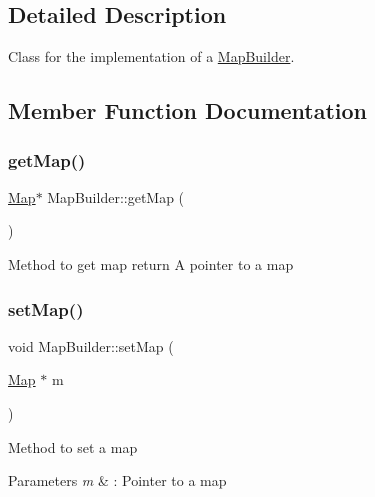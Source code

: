 \subsection{Detailed Description}
Class for the implementation of a \hyperlink{class_map_builder}{Map\+Builder}. 

\subsection{Member Function Documentation}
\hypertarget{class_map_builder_a6ea698affc46e8fab291eaf7b3ae8547}{}\label{class_map_builder_a6ea698affc46e8fab291eaf7b3ae8547} 
\subsubsection{\texorpdfstring{get\+Map()}{getMap()}}
{\footnotesize\ttfamily \hyperlink{class_map}{Map}$\ast$ Map\+Builder\+::get\+Map (\begin{DoxyParamCaption}{ }\end{DoxyParamCaption})\hspace{0.3cm}{\ttfamily [inline]}}

Method to get map return A pointer to a map \hypertarget{class_map_builder_aa8a9483778deb9083c5704b557adefdd}{}\label{class_map_builder_aa8a9483778deb9083c5704b557adefdd} 
\subsubsection{\texorpdfstring{set\+Map()}{setMap()}}
{\footnotesize\ttfamily void Map\+Builder\+::set\+Map (\begin{DoxyParamCaption}\item[{\hyperlink{class_map}{Map} $\ast$}]{m }\end{DoxyParamCaption})\hspace{0.3cm}{\ttfamily [inline]}}

Method to set a map 
\begin{DoxyParams}{Parameters}
{\em m} & \+: Pointer to a map \\
\hline
\end{DoxyParams}
\hypertarget{class_map_builder_a6d61977f2e49d1113c37352249f808c7}{}\label{class_map_builder_a6d61977f2e49d1113c37352249f808c7} 
